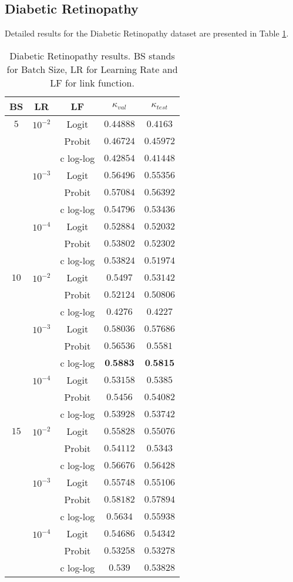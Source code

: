 \documentclass[10pt, a4paper, titlepage, twocolumn]{article}
\begin{document}
	\subsection{Diabetic Retinopathy}
	Detailed results for the Diabetic Retinopathy dataset are presented in Table \ref{table:DRresults}.
	
	\begin{table}[ht]
		\footnotesize
		\centering
		\begin{tabular}{ccc|cc}
			BS & LR & LF & $\kappa_{val}$ & $\kappa_{test}$\\\hline\addlinespace[0.05cm]
			$5$ & $10^{-2}$ & Logit & $0.44888$ & $0.4163$\\
			& & Probit & $0.46724$ & $0.45972$\\
			& & c log-log & $0.42854$ & $0.41448$\\
			& $10^{-3}$ & Logit & $0.56496$ & $0.55356$\\
			& & Probit & $0.57084$ & $0.56392$\\
			& & c log-log & $0.54796$ & $0.53436$\\
			& $10^{-4}$ & Logit & $0.52884$ & $0.52032$\\
			& & Probit & $0.53802$ & $0.52302$\\
			& & c log-log & $0.53824$ & $0.51974$\\
			$10$ & $10^{-2}$ & Logit & $0.5497$ & $0.53142$\\
			& & Probit & $0.52124$ & $0.50806$\\
			& & c log-log & $0.4276$ & $0.4227$\\
			& $10^{-3}$ & Logit & $0.58036$ & $0.57686$\\
			& & Probit & $0.56536$ & $0.5581$\\
			& & c log-log & $\textbf{0.5883}$ & $\textbf{0.5815}$\\
			& $10^{-4}$ & Logit & $0.53158$ & $0.5385$\\
			& & Probit & $0.5456$ & $0.54082$\\
			& & c log-log & $0.53928$ & $0.53742$\\
			$15$ & $10^{-2}$ & Logit & $0.55828$ & $0.55076$\\
			& & Probit & $0.54112$ & $0.5343$\\
			& & c log-log & $0.56676$ & $0.56428$\\
			& $10^{-3}$ & Logit & $0.55748$ & $0.55106$\\
			& & Probit & $0.58182$ & $0.57894$\\
			& & c log-log & $0.5634$ & $0.55938$\\
			& $10^{-4}$ & Logit & $0.54686$ & $0.54342$\\
			& & Probit & $0.53258$ & $0.53278$\\
			& & c log-log & $0.539$ & $0.53828$
		\end{tabular}
		\caption{Diabetic Retinopathy results. BS stands for Batch Size, LR for Learning Rate and LF for link function.}
		\label{table:DRresults}
	\end{table}
	
\end{document}
